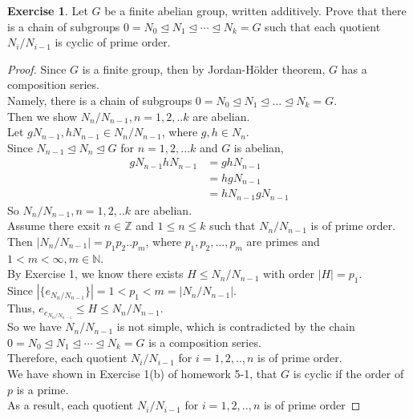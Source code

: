 \documentclass{amsart}
\newcommand{\bbz}{\mathbb{Z}}
\newcommand{\bbn}{\mathbb{N}}
\theoremstyle{plain}
\theoremstyle{definition}
\newtheorem{exer}[lem]{Exercise}
\begin{document}
\begin{exer}
Let $G$ be a finite abelian group, written additively.
Prove that there is a chain of subgroups $0=N_0\unlhd N_1\unlhd\cdots\unlhd N_k=G$ such that each quotient $N_i/N_{i-1}$ is cyclic of prime order.
\begin{proof}
	Since $G$ is a finite group, then by Jordan-H\"{o}lder theorem, $G$ has a composition series.\\
	Namely, there is a chain of subgroups $0= N_0 \unlhd N_1 \unlhd...\unlhd N_k = G$.\\
	Then we show $N_n/N_{n-1}, n = 1,2,..k$ are abelian. \\
  	Let $gN_{n-1}, hN_{n-1} \in N_n/N_{n-1}$, where $g,h \in N_n$.\\
  	Since $N_{n-1} \unlhd N_{n} \unlhd G$ for $n = 1,2,...k$ and $G$ is abelian,\\
  	\begin{align*}
  	  gN_{n-1}hN_{n-1} &= ghN_{n-1} \\
  	  				&= hgN_{n-1}\\
  	  				&=hN_{n-1}gN_{n-1}
  	\end{align*}
  	So $N_n/N_{n-1}, n = 1,2,..k$ are abelian.\\
	Assume there exsit $n \in \bbz$ and $1 \leq n \leq k$ such that $N_n/N_{n-1}$ is of prime order.\\
	Then $|N_n/N_{n-1}| = p_1p_2..p_m$, where $p_1,p_2,...,p_m$ are primes and $ 1< m < \infty, m \in \bbn$.\\
	By Exercise 1, we know there exists $H \leq N_n/N_{n-1}$ with order $|H|=p_1$. \\
	Since $|\{e_{N_n/N_{n-1}}\}|=1 < p_1 < m = |N_n/N_{n-1}|$.\\
	Thus, ${e_{e_{N_n/N_{n-1}}}} \leq H \leq N_n/N_{n-1}$.\\ 
	So we have $N_n/N_{n-1}$ is not simple, which is contradicted by the chain $0=N_0\unlhd N_1\unlhd\cdots\unlhd N_k=G$ is a composition series.\\
	Therefore, each quotient $N_i/N_{i-1}$ for $i=1,2,..,n$ is of prime order.\\
	We have shown in Exercise 1(b) of homework 5-1, that $G$ is cyclic if the order of $p$ is a prime.\\
	As a result, each quotient $N_i/N_{i-1}$ for $i=1,2,..,n$ is of prime order
 \end{proof}
\end{exer}
\end{document}
